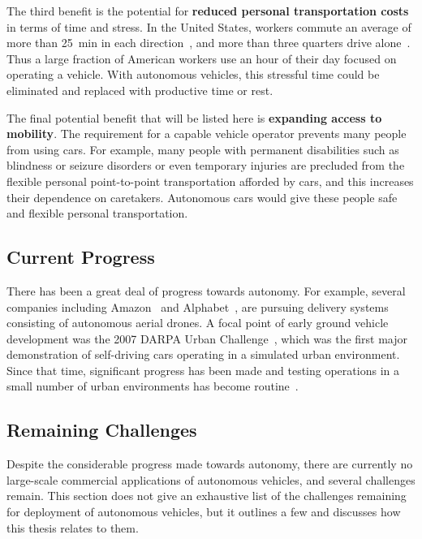 The third benefit is the potential for \textbf{reduced personal transportation costs} in terms of time and stress.
In the United States, workers commute an average of more than \SI{25}{\minute} in each direction~\cite{census2016travel}, and more than three quarters drive alone~\cite{mckenzie2015who}.
Thus a large fraction of American workers use an hour of their day focused on operating a vehicle.
With autonomous vehicles, this stressful time could be eliminated and replaced with productive time or rest.

The final potential benefit that will be listed here is \textbf{expanding access to mobility}.
The requirement for a capable vehicle operator prevents many people from using cars.
For example, many people with permanent disabilities such as blindness or seizure disorders or even temporary injuries are precluded from the flexible personal point-to-point transportation afforded by cars, and this increases their dependence on caretakers.
Autonomous cars would give these people safe and flexible personal transportation.

\subsection{Current Progress}

There has been a great deal of progress towards autonomy.
For example, several companies including Amazon~\cite{shaban2018amazon} and Alphabet~\cite{sandoval2018alphabet}, are pursuing delivery systems consisting of autonomous aerial drones.
A focal point of early ground vehicle development was the 2007 DARPA Urban Challenge~\cite{MB-KI-SS:10}, which was the first major demonstration of self-driving cars operating in a simulated urban environment.
Since that time, significant progress has been made and testing operations in a small number of urban environments has become routine~\cite{dolgov2016google}.

\subsection{Remaining Challenges}

Despite the considerable progress made towards autonomy, there are currently no large-scale commercial applications of autonomous vehicles, and several challenges remain.
This section does not give an exhaustive list of the challenges remaining for deployment of autonomous vehicles, but it outlines a few and discusses how this thesis relates to them.

